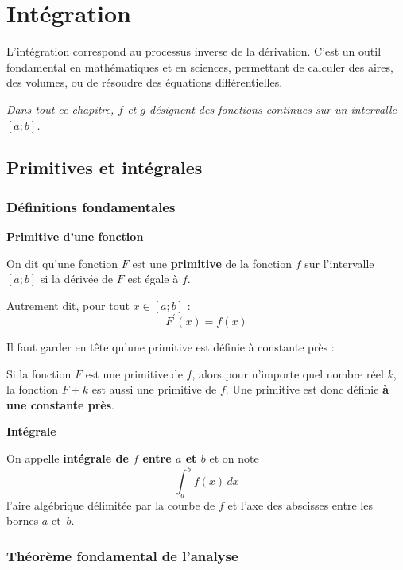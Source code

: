 \documentclass[../PolyS2.tex]{subfiles}
\begin{document}
\setcounter{chapter}{1}
\chapter{Intégration}

L'intégration correspond au processus inverse de la dérivation. C'est un outil fondamental en mathématiques et en sciences, permettant de calculer des aires, des volumes, ou de résoudre des équations différentielles.

\textit{Dans tout ce chapitre, $f$ et $g$ désignent des fonctions continues sur un intervalle $[a;b]$.}

\section{Primitives et intégrales}

\subsection{Définitions fondamentales}

\begin{Def}\textbf{Primitive d'une fonction}

On dit qu'une fonction $F$ est une \textbf{primitive} de la fonction $f$ sur l'intervalle $[a ; b]$ si la dérivée de $F$ est égale à $f$.

Autrement dit, pour tout $x \in[a ; b]$ :
$$F^{\prime}(x)=f(x)$$
\end{Def}

\begin{Rmq}
    Il faut garder en tête qu'une primitive est définie à constante près : 
    
    Si la fonction $F$ est une primitive de $f$, alors pour n'importe quel nombre réel $k$, la fonction $F+k$ est aussi une primitive de $f$. Une primitive est donc définie \textbf{à une constante près}.
\end{Rmq}

\begin{Def}\textbf{Intégrale}

On appelle \textbf{intégrale de $f$ entre $a$ et $b$} et on note
$$\int_a^b f(x) \, dx$$
l'aire algébrique délimitée par la courbe de $f$ et l'axe des abscisses entre les bornes $a$ et~$b$.
\end{Def}

\subsection{Théorème fondamental de l'analyse}
\end{document}
